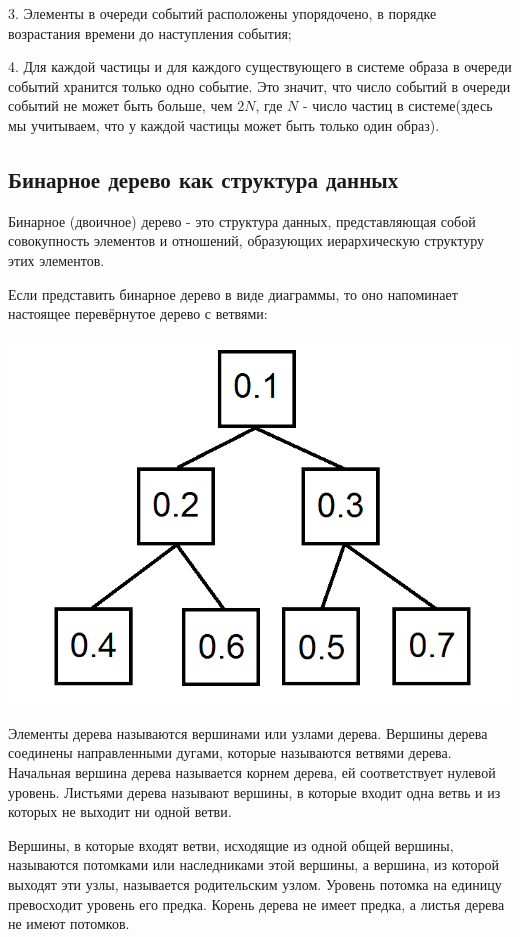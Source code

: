 \documentclass[a4paper]{article}
\begin{document}
3. Элементы в очереди событий расположены упорядочено, в порядке возрастания времени до наступления события;

4. Для каждой частицы и для каждого существующего в системе образа в очереди событий хранится только одно событие. Это значит, что число событий в очереди событий не может быть больше, чем $ 2N $, где $ N $ - число частиц в системе(здесь мы учитываем, что у каждой частицы может быть только один образ).



\subsection{Бинарное дерево как структура данных}
Бинарное (двоичное) дерево - это структура данных, представляющая собой совокупность элементов и отношений, образующих иерархическую структуру этих элементов.

Если представить бинарное дерево в виде диаграммы, то оно напоминает настоящее перевёрнутое дерево с ветвями:

\begin{center}
\includegraphics[scale=0.3]{binary_tree_intro.png}
\end{center}

Элементы дерева называются вершинами или узлами дерева. Вершины дерева соединены направленными дугами, которые называются ветвями дерева. Начальная вершина дерева называется корнем дерева, ей соответствует нулевой уровень. Листьями дерева называют вершины, в которые входит одна ветвь и из которых не выходит ни одной ветви.

Вершины, в которые входят ветви, исходящие из одной общей вершины, называются потомками или наследниками этой вершины, а вершина, из которой выходят эти узлы, называется родительским узлом.  Уровень потомка на единицу превосходит уровень его предка. Корень дерева не имеет предка, а листья дерева не имеют потомков.
\end{document}
